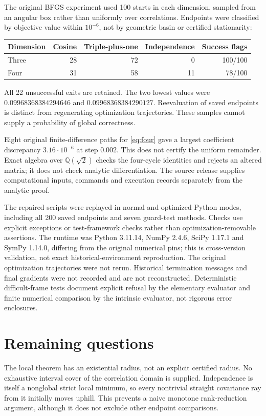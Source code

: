 \documentclass[11pt,a4paper]{article}
\theoremstyle{remark}\newtheorem{remark}[theorem]{Remark}
\begin{document}
The original BFGS experiment used 100 starts in each dimension, sampled from an angular box rather than uniformly over correlations. Endpoints were classified by objective value within $10^{-6}$, not by geometric basin or certified stationarity:
\begin{center}\begin{tabular}{lrrrr}\toprule
Dimension & Cosine & Triple-plus-one & Independence & Success flags\\\midrule
Three &28&72&0&100/100\\
Four &31&58&11&78/100\\\bottomrule
\end{tabular}\end{center}
All 22 unsuccessful exits are retained. The two lowest values were $0.09968368384294646$ and $0.09968368384290127$. Reevaluation of saved endpoints is distinct from regenerating optimization trajectories. These samples cannot supply a probability of global correctness.

Eight original finite-difference paths for \eqref{eq:four} gave a largest coefficient discrepancy $3.16\cdot10^{-6}$ at step $0.002$. This does not certify the uniform remainder. Exact algebra over $\mathbb Q(\sqrt2)$ checks the four-cycle identities and rejects an altered matrix; it does not check analytic differentiation. The source release supplies computational inputs, commands and execution records separately from the analytic proof.

The repaired scripts were replayed in normal and optimized Python modes, including all 200 saved endpoints and seven guard-test methods. Checks use explicit exceptions or test-framework checks rather than optimization-removable assertions. The runtime was Python 3.11.14, NumPy 2.4.6, SciPy 1.17.1 and SymPy 1.14.0, differing from the original numerical pins; this is cross-version validation, not exact historical-environment reproduction. The original optimization trajectories were not rerun. Historical termination messages and final gradients were not recorded and are not reconstructed. Deterministic difficult-frame tests document explicit refusal by the elementary evaluator and finite numerical comparison by the intrinsic evaluator, not rigorous error enclosures.

\section{Remaining questions}
The local theorem has an existential radius, not an explicit certified radius. No exhaustive interval cover of the correlation domain is supplied. Independence is itself a nonglobal strict local minimum, so every nontrivial straight covariance ray from it initially moves uphill. This prevents a naive monotone rank-reduction argument, although it does not exclude other endpoint comparisons.
\end{document}
